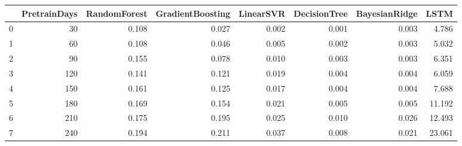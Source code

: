 \begin{tabular}{lrrrrrrr}
\toprule
{} &  PretrainDays &  RandomForest &  GradientBoosting &  LinearSVR &  DecisionTree &  BayesianRidge &   LSTM \\
\midrule
0 &            30 &         0.108 &             0.027 &      0.002 &         0.001 &          0.003 &  4.786 \\
1 &            60 &         0.108 &             0.046 &      0.005 &         0.002 &          0.003 &  5.032 \\
2 &            90 &         0.155 &             0.078 &      0.010 &         0.003 &          0.003 &  6.351 \\
3 &           120 &         0.141 &             0.121 &      0.019 &         0.004 &          0.004 &  6.059 \\
4 &           150 &         0.161 &             0.125 &      0.017 &         0.004 &          0.004 &  7.688 \\
5 &           180 &         0.169 &             0.154 &      0.021 &         0.005 &          0.005 & 11.192 \\
6 &           210 &         0.175 &             0.195 &      0.025 &         0.010 &          0.026 & 12.493 \\
7 &           240 &         0.194 &             0.211 &      0.037 &         0.008 &          0.021 & 23.061 \\
\bottomrule
\end{tabular}
